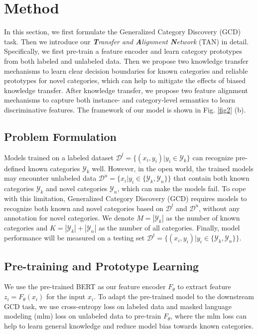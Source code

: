 \documentclass[letterpaper]{article} %
\begin{document}
\section{Method}
In this section, we first formulate the Generalized Category Discovery (GCD) task. Then we introduce our \textit{\textbf{T}ransfer and \textbf{A}lignment \textbf{N}etwork} (TAN) in detail. Specifically, we first pre-train a feature encoder and learn category prototypes from both labeled and unlabeled data. Then we propose two knowledge transfer mechanisms to learn clear decision boundaries for known categories and reliable prototypes for novel categories, which can help to mitigate the effects of biased knowledge transfer. After knowledge transfer, we propose two feature alignment mechanisms to capture both instance- and category-level semantics to learn discriminative features. The framework of our model is shown in Fig. \ref{fig2} (b).

\subsection{Problem Formulation}
Models trained on a labeled dataset $\mathcal{D}^{l} = \{(x_{i},y_{i})|y_{i} \in \mathcal{Y}_{k}\}$ can recognize pre-defined known categories $\mathcal{Y}_{k}$ well. However, in the open world, the trained models may encounter unlabeled data $\mathcal{D}^{u} = \{x_{i}|y_{i} \in \{\mathcal{Y}_{k}, \mathcal{Y}_{n} \}\}$ that contain both known categories $\mathcal{Y}_{k}$ and novel categories $\mathcal{Y}_{n}$, which can make the models fail. To cope with this limitation, Generalized Category Discovery (GCD) requires models to recognize both known and novel categories based on $\mathcal{D}^{l}$ and $\mathcal{D}^{u}$, without any annotation for novel categories. We denote $M = |\mathcal{Y}_{k}|$ as the number of known categories and $K = |\mathcal{Y}_{k}| + |\mathcal{Y}_{n}|$ as the number of all categories.
Finally, model performance will be measured on a testing set $\mathcal{D}^{t} = \{(x_{i},y_{i})|y_{i} \in \{\mathcal{Y}_{k}, \mathcal{Y}_{n} \}\}$.


\subsection{Pre-training and Prototype Learning}
We use the pre-trained BERT \citep{bert} as our feature encoder $F_{\theta}$ to extract feature $z_{i} = F_{\theta}(x_{i})$ for the input $x_{i}$. To adapt the pre-trained model to the downstream GCD task, we use cross-entropy loss on labeled data and masked language modeling (mlm) loss \citep{pretrain} on unlabeled data to pre-train $F_{\theta}$, where the mlm loss can help to learn general knowledge and reduce model bias towards known categories.
\end{document}
